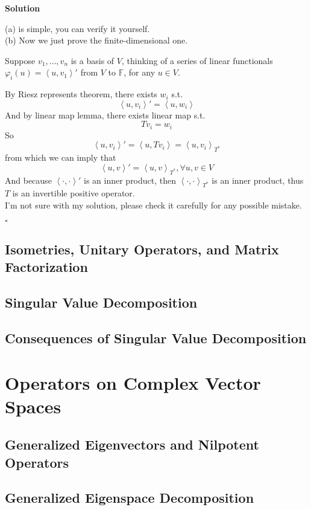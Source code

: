 \documentclass{article}
\newenvironment{solution}{%
{
    \textbf{Solution\\}
    }
}{
  \hfill $\square$ 
  \par\bigskip 
}
\newcommand{\FF}{\mathbb{F}}
\begin{document}
\begin{CJK}{UTF8}{gkai}
\begin{solution}
    (a) is simple, you can verify it yourself.\\

    (b) Now we just prove the finite-dimensional one.

    Suppose $v_1,\ldots,v_n$ is a basis of $V$, thinking of a series of linear functionals $\varphi_i(u) = \left<u,v_1\right>'$ from $V$ to $\FF$, for any $u \in V$.

    By Riesz represents theorem, there exists $w_i$ s.t. 
    \[\left<u,v_i\right>' = \left<u,w_i\right>\]
    And by linear map lemma, there exists linear map s.t.
    \[T v_i = w_i\]
    So 
    \[\left<u,v_i\right>' = \left<u,T v_i\right> = \left<u, v_i\right>_{T^\ast}\]
    from which we can imply that 
    \[\left<u,v\right>' = \left<u, v\right>_{T^\ast}, \forall u,v \in V \]
    And because $\left<\cdot,\cdot\right>'$ is an inner product, then $\left<\cdot,\cdot\right>_{T^\ast}$ is an inner product, thus $T$ is an invertible positive operator.\\
    
    I'm not sure with my solution, please check it carefully for any possible mistake.
\end{solution}
\subsection{Isometries, Unitary Operators, and Matrix Factorization}

\subsection{Singular Value Decomposition}

\subsection{Consequences of Singular Value Decomposition}

\section{Operators on Complex Vector Spaces}

\subsection{Generalized Eigenvectors and Nilpotent Operators}

\subsection{Generalized Eigenspace Decomposition}


\end{CJK}
\end{document}
